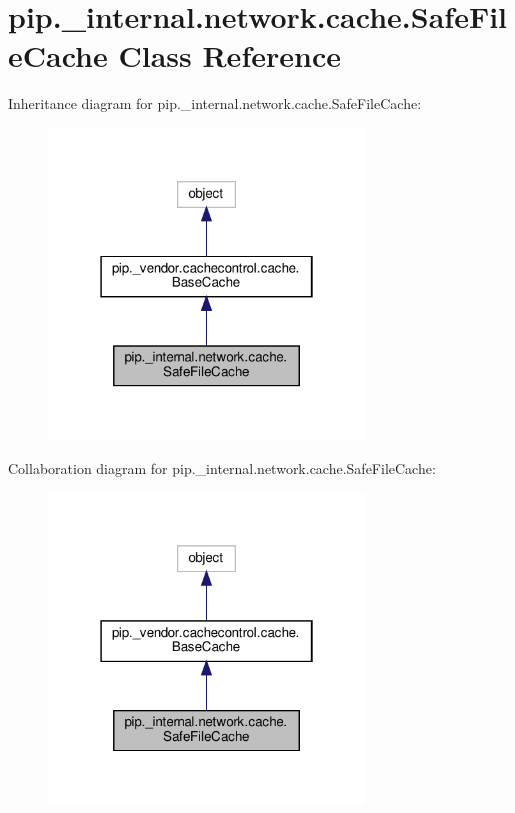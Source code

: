 \hypertarget{classpip_1_1__internal_1_1network_1_1cache_1_1SafeFileCache}{}\section{pip.\+\_\+internal.\+network.\+cache.\+Safe\+File\+Cache Class Reference}
\label{classpip_1_1__internal_1_1network_1_1cache_1_1SafeFileCache}


Inheritance diagram for pip.\+\_\+internal.\+network.\+cache.\+Safe\+File\+Cache\+:
\nopagebreak
\begin{figure}[H]
\begin{center}
\leavevmode
\includegraphics[width=238pt]{classpip_1_1__internal_1_1network_1_1cache_1_1SafeFileCache__inherit__graph}
\end{center}
\end{figure}


Collaboration diagram for pip.\+\_\+internal.\+network.\+cache.\+Safe\+File\+Cache\+:
\nopagebreak
\begin{figure}[H]
\begin{center}
\leavevmode
\includegraphics[width=238pt]{classpip_1_1__internal_1_1network_1_1cache_1_1SafeFileCache__coll__graph}
\end{center}
\end{figure}
